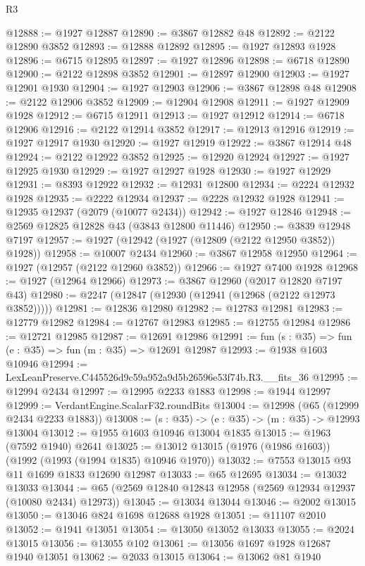\begin{lexlean}{R3}
\begin{coremodule}
@12888 := @1927 @12887
@12890 := @3867 @12882 @48
@12892 := @2122 @12890 @3852
@12893 := @12888 @12892
@12895 := @1927 @12893 @1928
@12896 := @6715 @12895
@12897 := @1927 @12896
@12898 := @6718 @12890
@12900 := @2122 @12898 @3852
@12901 := @12897 @12900
@12903 := @1927 @12901 @1930
@12904 := @1927 @12903
@12906 := @3867 @12898 @48
@12908 := @2122 @12906 @3852
@12909 := @12904 @12908
@12911 := @1927 @12909 @1928
@12912 := @6715 @12911
@12913 := @1927 @12912
@12914 := @6718 @12906
@12916 := @2122 @12914 @3852
@12917 := @12913 @12916
@12919 := @1927 @12917 @1930
@12920 := @1927 @12919
@12922 := @3867 @12914 @48
@12924 := @2122 @12922 @3852
@12925 := @12920 @12924
@12927 := @1927 @12925 @1930
@12929 := @1927 @12927 @1928
@12930 := @1927 @12929
@12931 := @8393 @12922
@12932 := @12931 @12800
@12934 := @2224 @12932 @1928
@12935 := @2222 @12934
@12937 := @2228 @12932 @1928
@12941 := @12935 @12937 (@2079 (@10077 @2434))
@12942 := @1927 @12846
@12948 := @2569 @12825 @12828 @43 (@3843 @12800 @11446)
@12950 := @3839 @12948 @7197
@12957 := @1927 (@12942 (@1927 (@12809 (@2122 @12950 @3852)) @1928))
@12958 := @10007 @2434
@12960 := @3867 @12958 @12950
@12964 := @1927 (@12957 (@2122 @12960 @3852))
@12966 := @1927 @7400 @1928
@12968 := @1927 (@12964 @12966)
@12973 := @3867 @12960 (@2017 @12820 @7197 @43)
@12980 := @2247 (@12847 (@12930 (@12941 (@12968 (@2122 @12973 @3852)))))
@12981 := @12836 @12980
@12982 := @12783 @12981
@12983 := @12779 @12982
@12984 := @12767 @12983
@12985 := @12755 @12984
@12986 := @12721 @12985
@12987 := @12691 @12986
@12991 := fun (s : @35) => fun (e : @35) => fun (m : @35) => @12691 @12987
@12993 := @1938 @1603 @10946
@12994 := LexLeanPreserve.C445526d9c59a952a9d5b26596e53f74b.R3.__fits_36
@12995 := @12994 @2434
@12997 := @12995 @2233 @1883
@12998 := @1944 @12997
@12999 := VerdantEngine.ScalarF32.roundBits
@13004 := @12998 (@65 (@12999 @2434 @2233 @1883))
@13008 := (s : @35) -> (e : @35) -> (m : @35) -> @12993 @13004
@13012 := @1955 @1603 @10946 @13004 @1835
@13015 := @1963 (@7592 @1940) @2641
@13025 := @13012 @13015 (@1976 (@1986 @1603)) (@1992 (@1993 (@1994 @1835) @10946 @1970))
@13032 := @7553 @13015 @93 @11 @1699 @1833 @12690 @12987
@13033 := @65 @12695
@13034 := @13032 @13033
@13044 := @65 (@2569 @12840 @12843 @12958 (@2569 @12934 @12937 (@10080 @2434) @12973))
@13045 := @13034 @13044
@13046 := @2002 @13015
@13050 := @13046 @824 @1698 @12688 @1928
@13051 := @11107 @2010
@13052 := @1941 @13051
@13054 := @13050 @13052 @13033
@13055 := @2024 @13015
@13056 := @13055 @102
@13061 := @13056 @1697 @1928 @12687 @1940 @13051
@13062 := @2033 @13015
@13064 := @13062 @81 @1940

\end{coremodule}
\end{lexlean}
